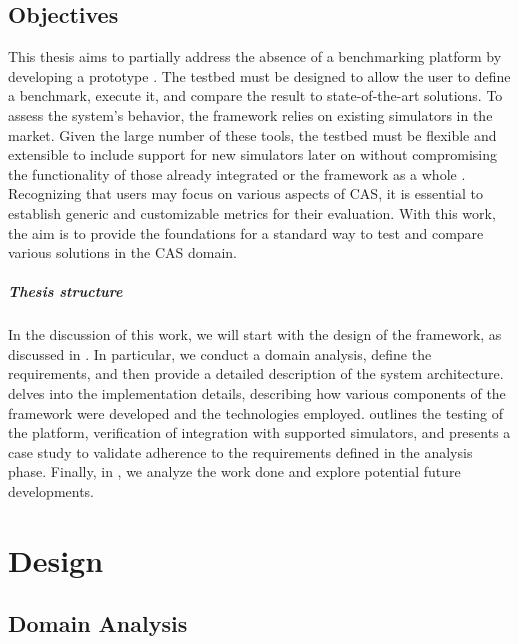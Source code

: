 \documentclass[12pt,a4paper,openright,twoside]{book}
\begin{document}
\section{Objectives}
This thesis aims to partially address the absence of a benchmarking platform by developing a prototype \cite{DBLP:conf/cisis/VilenicaL12, DBLP:conf/atal/ZhangZWBR20}.
The testbed must be designed to allow the user to define a benchmark, execute it, and compare the result to state-of-the-art solutions.
To assess the system's behavior, the framework relies on existing simulators in the market. 
Given the large number of these tools, the testbed must be flexible and extensible to include support for new simulators later on without compromising the functionality of those already integrated or the framework as a whole \cite{DBLP:conf/mascots/Dujmovic99}.
Recognizing that users may focus on various aspects of \ac*{CAS}, it is essential to establish generic and customizable metrics for their evaluation.
With this work, the aim is to provide the foundations for a standard way to test and compare various solutions in the \ac*{CAS} domain.

\paragraph*{Thesis structure}

In the discussion of this work, we will start with the design of the framework, as discussed in . 
In particular, we conduct a domain analysis, define the requirements, and then provide a detailed description of the system architecture. 
 delves into the implementation details, describing how various components of the framework were developed and the technologies employed. 
 outlines the testing of the platform, verification of integration with supported simulators, and presents a case study to validate adherence to the requirements defined in the analysis phase. 
Finally, in , we analyze the work done and explore potential future developments.

\chapter{Design}
\label{ch:design}

\section{Domain Analysis}
\end{document}
